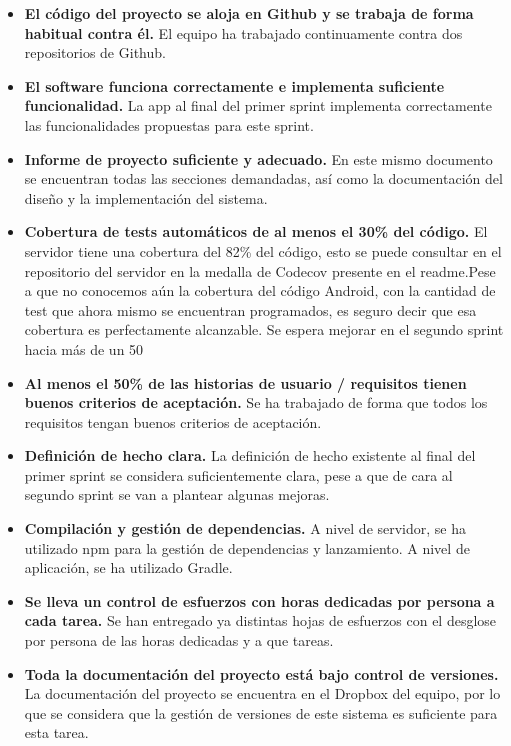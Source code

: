 \documentclass[11pt,a4paper]{report}
\begin{document}
\begin{itemize}
	\item \textbf{El código del proyecto se aloja en Github y se trabaja de forma habitual contra él.} El equipo ha trabajado continuamente contra dos repositorios de Github.
	\item \textbf{El software funciona correctamente e implementa suficiente funcionalidad.} La app al final del primer sprint implementa correctamente las funcionalidades propuestas para este sprint.
	\item \textbf{Informe de proyecto suficiente y adecuado.} En este mismo documento se encuentran todas las secciones demandadas, así como la documentación del diseño y la implementación del sistema.
	\item \textbf{Cobertura de tests automáticos de al menos el 30\% del código.} El servidor tiene una cobertura del 82\% del código, esto se puede consultar en el repositorio del servidor en la medalla de Codecov presente en el readme.Pese a que no conocemos aún la cobertura del código Android, con la cantidad de test que ahora mismo se encuentran programados, es seguro decir que esa cobertura es perfectamente alcanzable. Se espera mejorar en el segundo sprint hacia más de un 50%
	\item \textbf{Al menos el 50\% de las historias de usuario / requisitos tienen buenos criterios de aceptación.} Se ha trabajado de forma que todos los requisitos tengan buenos criterios de aceptación.
	\item \textbf{Definición de hecho clara.} La definición de hecho existente al final del primer sprint se considera suficientemente clara, pese a que de cara al segundo sprint se van a plantear algunas mejoras.
	\item \textbf{Compilación y gestión de dependencias.} A nivel de servidor, se ha utilizado npm para la gestión de dependencias y lanzamiento. A nivel de aplicación, se ha utilizado Gradle.
	\item \textbf{Se lleva un control de esfuerzos con horas dedicadas por persona a cada tarea.} Se han entregado ya distintas hojas de esfuerzos con el desglose por persona de las horas dedicadas y a que tareas.
	\item \textbf{Toda la documentación del proyecto está bajo control de versiones.} La documentación del proyecto se encuentra en el Dropbox del equipo, por lo que se considera que la gestión de versiones de este sistema es suficiente para esta tarea.
\end{itemize}
\end{document}
